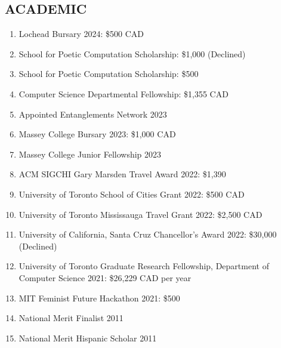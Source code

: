 \subsection{ACADEMIC}

\begin{enumerate}
    \item Lochead Bursary 2024: \$500 CAD
    \item School for Poetic Computation Scholarship: \$1,000 (Declined)
    \item School for Poetic Computation Scholarship: \$500
    \item Computer Science Departmental Fellowship: \$1,355 CAD
    \item Appointed Entanglements Network 2023
    \item Massey College Bursary 2023: \$1,000 CAD
    \item Massey College Junior Fellowship 2023
    \item ACM SIGCHI Gary Marsden Travel Award 2022: \$1,390
    \item University of Toronto School of Cities Grant 2022: \$500 CAD
    \item University of Toronto Mississauga Travel Grant 2022: \$2,500 CAD
    \item University of California, Santa Cruz Chancellor's Award 2022: \$30,000 (Declined)
    \item University of Toronto Graduate Research Fellowship, Department of Computer Science 2021: \$26,229 CAD per year
    \item MIT Feminist Future Hackathon 2021: \$500
    \item National Merit Finalist 2011
    \item National Merit Hispanic Scholar 2011
\end{enumerate}
